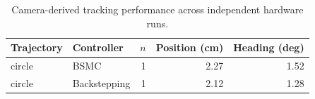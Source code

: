 \begin{table}[!t]
\centering
\caption{Camera-derived tracking performance across independent hardware runs.}
\label{tab:tracking}
\begin{tabular}{llrrr}
\hline
Trajectory & Controller & $n$ & Position (cm) & Heading (deg) \\
\hline
circle & BSMC & 1 & 2.27 & 1.52 \\
circle & Backstepping & 1 & 2.12 & 1.28 \\
\hline
\end{tabular}
\end{table}
